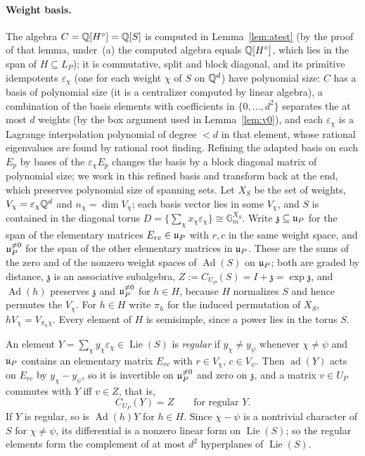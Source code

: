 \paragraph{Weight basis.} The algebra $C=\mathbb{Q}[H^\circ]=\mathbb{Q}[S]$ is computed in Lemma~\ref{lem:atest} (by
the proof of that lemma, under~(a) the computed algebra equals $\mathbb{Q}[H^\circ]$, which lies in the span of
$H\subseteq L_P$); it
is commutative, split and block diagonal, and its primitive idempotents $\varepsilon_\chi$ (one for
each weight $\chi$ of $S$ on $\mathbb{Q}^d$) have polynomial size: $C$ has a basis of polynomial size (it is a
centralizer computed by linear algebra), a combination of the basis elements with coefficients in
$\{0,\ldots,d^2\}$ separates the at most $d$ weights (by the box argument used in Lemma~\ref{lem:v0}), and each
$\varepsilon_\chi$ is a Lagrange interpolation polynomial of degree $<d$ in that element, whose
rational eigenvalues are found by rational root finding. Refining the adapted basis on each $E_p$ by bases of the
$\varepsilon_\chi E_p$ changes the basis by a block diagonal matrix of polynomial size; we work in
this refined basis and transform back at the end, which preserves polynomial size of spanning sets.
Let $X_S$ be the set of weights, $V_\chi=\varepsilon_\chi\mathbb{Q}^d$ and $n_\chi=\dim V_\chi$; each basis
vector lies in some $V_\chi$, and $S$ is contained in the diagonal torus
$D=\{\sum_\chi x_\chi\varepsilon_\chi\}\cong\mathbb G_m^{X_S}$. Write $\mathfrak z\subseteq\mathfrak{u}_P$ for
the span of the elementary matrices $E_{rc}\in\mathfrak{u}_P$ with $r,c$ in the same weight space, and
$\mathfrak{u}_P^{\ne0}$ for the span of the other elementary matrices in $\mathfrak{u}_P$. These are the sums of the
zero and of the nonzero weight spaces of $\operatorname{Ad}(S)$ on $\mathfrak{u}_P$; both are graded by distance,
$\mathfrak z$ is an associative subalgebra, $Z:=C_{U_P}(S)=I+\mathfrak z=\exp\mathfrak z$, and
$\operatorname{Ad}(h)$ preserves $\mathfrak z$ and $\mathfrak{u}_P^{\ne0}$ for $h\in H$, because $H$ normalizes $S$ and
hence permutes the $V_\chi$. For $h\in H$ write $\pi_h$ for the induced permutation of $X_S$,
$hV_\chi=V_{\pi_h\chi}$. Every element of $H$ is semisimple, since a power lies in the torus $S$.

An element $Y=\sum_\chi y_\chi\varepsilon_\chi\in\operatorname{Lie}(S)$ is \emph{regular} if
$y_\chi\ne y_\psi$ whenever $\chi\ne\psi$ and $\mathfrak{u}_P$ contains an elementary matrix $E_{rc}$ with
$r\in V_\chi$, $c\in V_\psi$. Then $\operatorname{ad}(Y)$ acts on $E_{rc}$ by $y_\chi-y_\psi$, so it is invertible on
$\mathfrak{u}_P^{\ne0}$ and zero on $\mathfrak z$, and a matrix $v\in U_P$ commutes with $Y$ iff $v\in Z$, that is,
\begin{equation}\label{eq:regcent}
C_{U_P}(Y)=Z\qquad\text{for regular }Y.
\end{equation}
If $Y$ is regular, so is $\operatorname{Ad}(h)Y$ for $h\in H$. Since $\chi-\psi$ is a nontrivial character of
$S$ for $\chi\ne\psi$, its differential is a nonzero linear form on $\operatorname{Lie}(S)$; so the regular elements
form the complement of at most $d^2$ hyperplanes of $\operatorname{Lie}(S)$.

